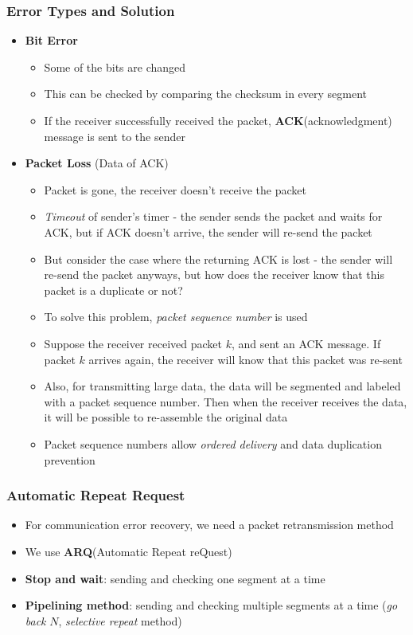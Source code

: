 \subsubsection{Error Types and Solution}
\begin{itemize}
	\item \textbf{Bit Error}
	\begin{itemize}
		\item Some of the bits are changed
		\item This can be checked by comparing the checksum in every segment
		\item If the receiver successfully received the packet, \textbf{ACK}(acknowledgment) message is sent to the sender
	\end{itemize}
	\item \textbf{Packet Loss} (Data of ACK)
	\begin{itemize}
		\item Packet is gone, the receiver doesn't receive the packet
		\item \textit{Timeout} of sender's timer - the sender sends the packet and waits for ACK, but if ACK doesn't arrive, the sender will re-send the packet
		\item But consider the case where the returning ACK is lost - the sender will re-send the packet anyways, but how does the receiver know that this packet is a duplicate or not?
		\item To solve this problem, \textit{packet sequence number} is used
		\item Suppose the receiver received packet $k$, and sent an ACK message. If packet $k$ arrives again, the receiver will know that this packet was re-sent
		\item Also, for transmitting large data, the data will be segmented and labeled with a packet sequence number. Then when the receiver receives the data, it will be possible to re-assemble the original data
		\item Packet sequence numbers allow \textit{ordered delivery} and data duplication prevention
	\end{itemize}
\end{itemize}

\subsubsection{Automatic Repeat Request}
\begin{itemize}
	\item For communication error recovery, we need a packet retransmission method
	\item We use \textbf{ARQ}(Automatic Repeat reQuest)
	\item \textbf{Stop and wait}: sending and checking one segment at a time
	\item \textbf{Pipelining method}: sending and checking multiple segments at a time (\textit{go back} $N$, \textit{selective repeat} method)
\end{itemize}


